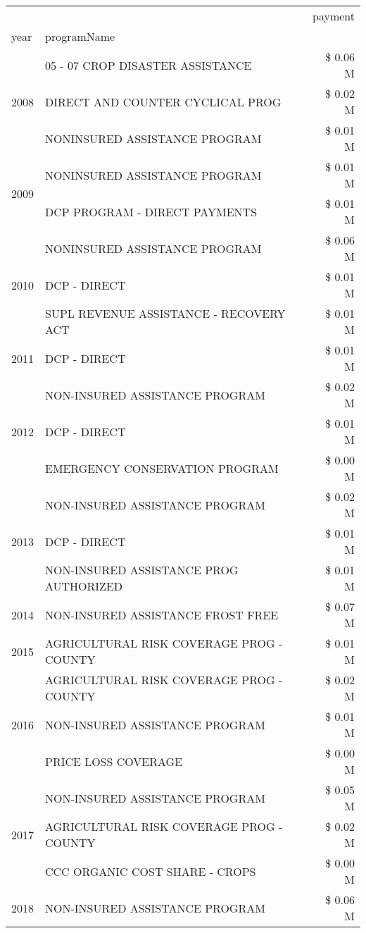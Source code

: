 \begin{tabular}{llr}
\toprule
 &  & payment \\
year & programName &  \\
\midrule
\multirow[t]{3}{*}{2008} & 05 - 07 CROP DISASTER ASSISTANCE & \$ 0.06 M \\
 & DIRECT AND COUNTER CYCLICAL PROG & \$ 0.02 M \\
 & NONINSURED ASSISTANCE PROGRAM & \$ 0.01 M \\
\cline{1-3}
\multirow[t]{2}{*}{2009} & NONINSURED ASSISTANCE PROGRAM & \$ 0.01 M \\
 & DCP PROGRAM - DIRECT PAYMENTS & \$ 0.01 M \\
\cline{1-3}
\multirow[t]{3}{*}{2010} & NONINSURED ASSISTANCE PROGRAM & \$ 0.06 M \\
 & DCP - DIRECT & \$ 0.01 M \\
 & SUPL REVENUE ASSISTANCE - RECOVERY ACT & \$ 0.01 M \\
\cline{1-3}
2011 & DCP - DIRECT & \$ 0.01 M \\
\cline{1-3}
\multirow[t]{3}{*}{2012} & NON-INSURED ASSISTANCE PROGRAM & \$ 0.02 M \\
 & DCP - DIRECT & \$ 0.01 M \\
 & EMERGENCY CONSERVATION PROGRAM & \$ 0.00 M \\
\cline{1-3}
\multirow[t]{3}{*}{2013} & NON-INSURED ASSISTANCE PROGRAM & \$ 0.02 M \\
 & DCP - DIRECT & \$ 0.01 M \\
 & NON-INSURED ASSISTANCE PROG AUTHORIZED & \$ 0.01 M \\
\cline{1-3}
2014 & NON-INSURED ASSISTANCE FROST FREE & \$ 0.07 M \\
\cline{1-3}
2015 & AGRICULTURAL RISK COVERAGE PROG - COUNTY & \$ 0.01 M \\
\cline{1-3}
\multirow[t]{3}{*}{2016} & AGRICULTURAL RISK COVERAGE PROG - COUNTY & \$ 0.02 M \\
 & NON-INSURED ASSISTANCE PROGRAM & \$ 0.01 M \\
 & PRICE LOSS COVERAGE & \$ 0.00 M \\
\cline{1-3}
\multirow[t]{3}{*}{2017} & NON-INSURED ASSISTANCE PROGRAM & \$ 0.05 M \\
 & AGRICULTURAL RISK COVERAGE PROG - COUNTY & \$ 0.02 M \\
 & CCC ORGANIC COST SHARE - CROPS & \$ 0.00 M \\
\cline{1-3}
\multirow[t]{3}{*}{2018} & NON-INSURED ASSISTANCE PROGRAM & \$ 0.06 M \\

\end{tabular}
